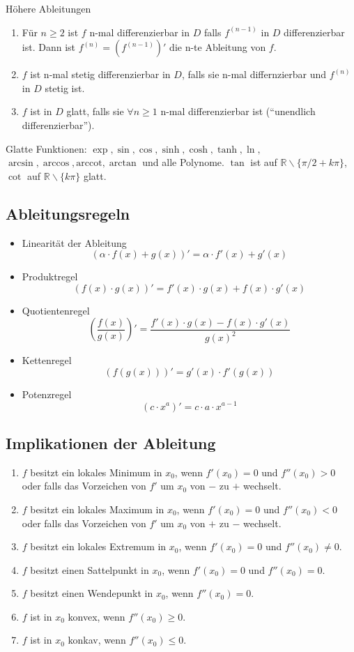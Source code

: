 \documentclass[a4paper,10pt]{article}
\def\R{\mathbb{R}}
\begin{document}
\begin{mainbox}{Höhere Ableitungen}
 \begin{enumerate}
  \item Für $n \ge 2$ ist $f$ n-mal differenzierbar in $D$ falls $f^{(n-1)}$ in $D$ differenzierbar ist. Dann ist $f^{(n)} = (f^{(n-1)})'$ die n-te Ableitung von $f$.
  \item $f$ ist n-mal stetig differenzierbar in $D$, falls sie n-mal differnzierbar und $f^{(n)}$ in $D$ stetig ist.
  \item $f$ ist in $D$ glatt, falls sie $\forall n \ge 1$ n-mal differenzierbar ist (``unendlich differenzierbar'').
 \end{enumerate}
\end{mainbox}
Glatte Funktionen: $\exp, \sin, \cos, \sinh, \cosh, \tanh, \ln,$\\ $ \arcsin, \arccos, \text{arccot}, \arctan$ und alle Polynome. $\tan$ ist auf $\R \backslash \{\pi/2 + k\pi\}$, $\cot$ auf $\R \backslash \{k\pi\}$ glatt.

\subsection{Ableitungsregeln}

\begin{itemize}
  \item Linearität der Ableitung
  $$(\alpha \cdot f(x) + g(x))' = \alpha \cdot f'(x) + g'(x)$$
  \item Produktregel
  $$(f(x) \cdot g(x))' = f'(x) \cdot g(x) + f(x) \cdot g'(x)$$
  \item Quotientenregel
  $$\left(\frac{f(x)}{g(x)}\right)' = \frac{f'(x) \cdot g(x) - f(x) \cdot g'(x)}{g(x)^2}$$
  \item Kettenregel
  $$(f(g(x)))' = g'(x) \cdot f'(g(x))$$
  \item Potenzregel
  $$(c \cdot x^a)' = c \cdot a \cdot x^{a - 1}$$
\end{itemize}

\subsection{Implikationen der Ableitung}
\begin{enumerate}
  \item $f$ besitzt ein lokales Minimum in $x_0$, wenn $f'(x_0) = 0$ und $f''(x_0) > 0$ oder falls das Vorzeichen von $f'$ um $x_0$ von $-$ zu $+$ wechselt.
  \item $f$ besitzt ein lokales Maximum in $x_0$, wenn $f'(x_0) = 0$ und $f''(x_0) < 0$ oder falls das Vorzeichen von $f'$ um $x_0$ von $+$ zu $-$ wechselt.
  \item $f$ besitzt ein lokales Extremum in $x_0$, wenn $f'(x_0) = 0$ und $f''(x_0) \ne 0$.
  \item $f$ besitzt einen Sattelpunkt in $x_0$, wenn $f'(x_0) = 0$ und $f''(x_0) = 0$.
  \item $f$ besitzt einen Wendepunkt in $x_0$, wenn $f''(x_0) = 0$.
  \item $f$ ist in $x_0$ konvex, wenn $f''(x_0) \ge 0$.
  \item $f$ ist in $x_0$ konkav, wenn $f''(x_0) \le 0$.
\end{enumerate}
\end{document}
